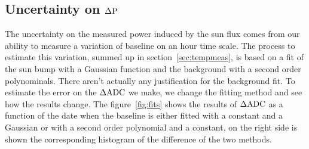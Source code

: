 \subsection{Uncertainty on $\rm \Delta P$}
The uncertainty  on the measured power  induced by the  sun flux comes
from our  ability to measure a  variation of baseline on  an hour time
scale.   The  process  to   estimate  this  variation,  summed  up  in
section~\ref{sec:tempmeas}, is based  on a fit of the  sun bump with a
Gaussian function and the background with a second order polynominals.
There  aren't actually any  justification for  the background  fit. To
estimate the  error on  the $\rm  \Delta ADC$ we  make, we  change the
fitting   method    and   see    how   the   results    change.    The
figure~\ref{fig:fits}  shows the  results  of $\rm  \Delta  ADC$ as  a
function  of  the date  when  the baseline  is  either  fitted with  a
constant  and a  Gaussian  or with  a  second order  polynomial and  a
constant, on  the right side  is shown the corresponding  histogram of
the difference of the two methods. 
